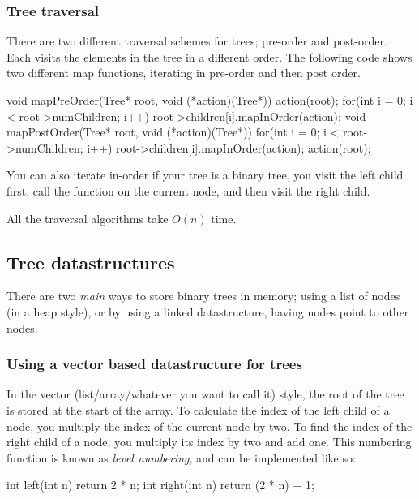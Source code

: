 \subsubsection{Tree traversal}

There are two different traversal schemes for trees; pre-order and post-order.
Each visits the elements in the tree in a different order. The following code
shows two different map functions, iterating in pre-order and then post order.

\begin{ccode}
  void mapPreOrder(Tree* root, void (*action)(Tree*)) {
    action(root);
    for(int i = 0; i < root->numChildren; i++) {
      root->children[i].mapInOrder(action);
    }
  }
  void mapPostOrder(Tree* root, void (*action)(Tree*)) {
    for(int i = 0; i < root->numChildren; i++) {
      root->children[i].mapInOrder(action);
    }
    action(root);
  }
\end{ccode}

You can also iterate in-order if your tree is a binary tree, you visit the left
child first, call the function on the current node, and then visit the right
child.

All the traversal algorithms take $O(n)$ time. 

\subsection{Tree datastructures}

There are two \textit{main} ways to store binary trees in memory; using a list
of nodes (in a heap style), or by using a linked datastructure, having nodes
point to other nodes.

\subsubsection{Using a vector based datastructure for trees}

In the vector (list/array/whatever you want to call it) style, the root of the
tree is stored at the start of the array. To calculate the index of the left
child of a node, you multiply the index of the current node by two. To find the
index of the right child of a node, you multiply its index by two and add one.
This numbering function is known as \textit{level numbering}, and can be
implemented like so:

\begin{ccode}
  int left(int n) { return 2 * n; }
  int right(int n) { return (2 * n) + 1; }
\end{ccode}


